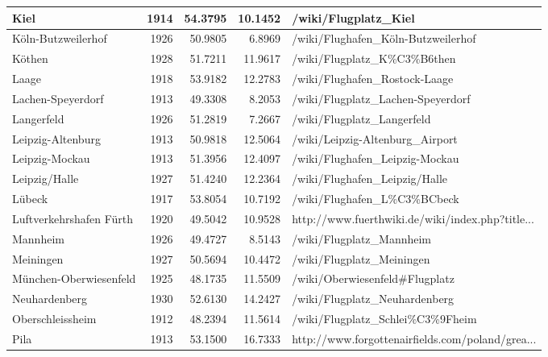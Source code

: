 \begin{table}[h!]
{\begin{tabular}{p{2.8cm}rrrp{6cm}}
  Kiel & 1914 & 54.3795 & 10.1452 & /wiki/Flugplatz\_Kiel \\ 
   \midrule
K\"oln-Butzweilerhof & 1926 & 50.9805 & 6.8969 & /wiki/Flughafen\_K\"oln-Butzweilerhof \\ 
  K\"othen & 1928 & 51.7211 & 11.9617 & /wiki/Flugplatz\_K\%C3\%B6then \\ 
  Laage & 1918 & 53.9182 & 12.2783 & /wiki/Flughafen\_Rostock-Laage \\ 
  Lachen-Speyerdorf & 1913 & 49.3308 & 8.2053 & /wiki/Flugplatz\_Lachen-Speyerdorf \\ 
  Langerfeld & 1926 & 51.2819 & 7.2667 & /wiki/Flugplatz\_Langerfeld \\ 
  Leipzig-Altenburg & 1913 & 50.9818 & 12.5064 & /wiki/Leipzig-Altenburg\_Airport \\ 
  Leipzig-Mockau & 1913 & 51.3956 & 12.4097 & /wiki/Flughafen\_Leipzig-Mockau \\ 
  Leipzig/Halle  & 1927 & 51.4240 & 12.2364 & /wiki/Flughafen\_Leipzig/Halle \\ 
  L\"ubeck & 1917 & 53.8054 & 10.7192 & /wiki/Flughafen\_L\%C3\%BCbeck \\ 
  Luftverkehrshafen F\"urth & 1920 & 49.5042 & 10.9528 & http://www.fuerthwiki.de/wiki/index.php?title... \\ 
%
 \midrule
Mannheim & 1926 & 49.4727 & 8.5143 & /wiki/Flugplatz\_Mannheim \\ 
  Meiningen & 1927 & 50.5694 & 10.4472 & /wiki/Flugplatz\_Meiningen \\ 
  M\"unchen-Oberwiesenfeld & 1925 & 48.1735 & 11.5509 & /wiki/Oberwiesenfeld\#Flugplatz \\ 
  Neuhardenberg & 1930 & 52.6130 & 14.2427 & /wiki/Flugplatz\_Neuhardenberg \\ 
 Oberschleissheim & 1912 & 48.2394 & 11.5614 & /wiki/Flugplatz\_Schlei\%C3\%9Fheim \\ 
  Pila & 1913 & 53.1500 & 16.7333 & http://www.forgottenairfields.com/poland/grea... \\ 

\end{tabular}}
\end{table}
